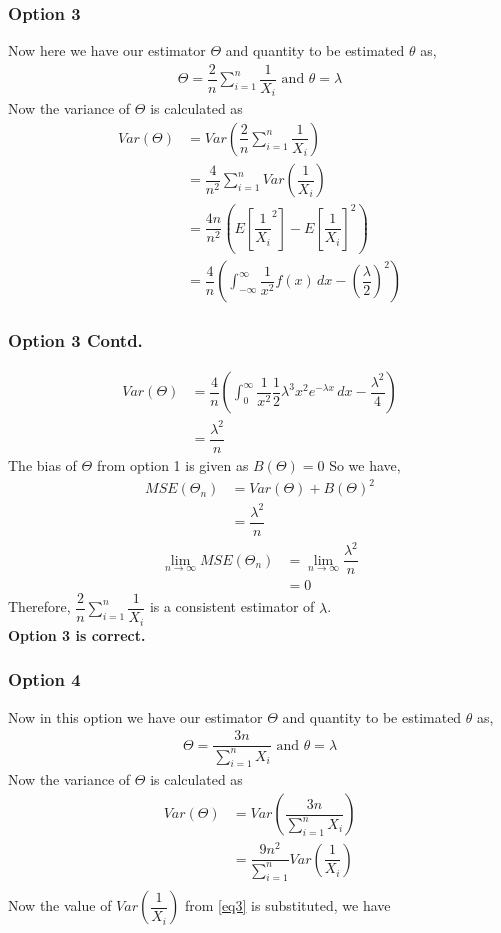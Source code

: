 \documentclass{beamer}
\providecommand{\brak}[1]{\ensuremath{\left(#1\right)}}
\begin{document}
 \begin{frame}
 \frametitle{Option 3}
    Now here we have our estimator $ \Theta$ and quantity to be estimated $ \theta $ as,
 \begin{align}
     \Theta = \dfrac{2}{n} \sum_{i=1}^{n} \dfrac{1}{X_i} \text{  and  }
     \theta = \lambda
 \end{align}  
 Now the variance of $ \Theta$ is calculated as
\begin{align}
    Var(\Theta) &= Var\brak{\dfrac{2}{n} \sum_{i=1}^{n} \dfrac{1}{X_i} } \\
    & = \dfrac{4}{n^2} \sum_{i=1}^{n} Var\brak{\dfrac{1}{X_i}} \\
    \label{eq3}
    & = \dfrac{4n}{n^2} \brak{E  \left[ {\dfrac{1}{X_i}}^2  \right] - {E  \left[ {\dfrac{1}{X_i}}  \right]}^2 } \\
    & = \dfrac{4}{n} \brak{ \int_{-\infty}^{\infty} \dfrac{1}{x^2} f(x)\,dx  - \brak{\dfrac{\lambda}{2}}^2 } 
\end{align}
\end{frame}

\begin{frame}
 \frametitle{Option 3 Contd.}
\begin{align}
     Var(\Theta)  & =  \dfrac{4}{n} \brak{ \int_{0}^{\infty} \dfrac{1}{x^2}  \dfrac{1}{2} \lambda^3x^2e^{-\lambda x} \,dx  - {\dfrac{\lambda^2}{4}} } \\
    &= \dfrac{\lambda^2}{n}
\end{align}
The bias of $ \Theta $ from option 1 is given as $B(\Theta) = 0$
So we have,
\begin{align}
    MSE(\Theta_n) &= Var(\Theta) + B(\Theta)^2 \\
    &= \dfrac{\lambda^2}{n}
\end{align}
\begin{align}
     \lim_{n\to\infty} MSE( \Theta_n) &=    \lim_{n\to\infty} \dfrac{\lambda^2}{n} \\
      &= 0
\end{align}
Therefore, $\dfrac{2}{n} \sum_{i=1}^{n} \dfrac{1}{X_i} $ is a consistent estimator of $ \lambda$. \\
\textbf{Option 3 is correct.}
\end{frame}
 
 \begin{frame}
 \frametitle{Option 4}
 Now in this option we have our estimator $ \Theta$ and quantity to be estimated $ \theta $ as,
 \begin{align}
     \Theta = \dfrac{3n}{\sum_{i=1}^{n} X_i } \text{  and  }
     \theta = \lambda
 \end{align}
Now the variance of $ \Theta$ is calculated as
\begin{align}
    Var(\Theta) &= Var\brak{\dfrac{3n}{\sum_{i=1}^{n} X_i } } \\
    & = \dfrac{9n^2}{ \sum_{i=1}^{n}} Var\brak{\dfrac{1}{X_i}} \\
\end{align}
Now the value of $ Var\brak{\dfrac{1}{X_i}} $ from \eqref{eq3} is substituted, we have
 \end{frame}
\end{document}
